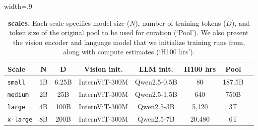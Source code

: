 \begin{table}[!t]
\centering
\caption{\textbf{\dcvlm scales.} Each scale specifies model size ($N$), number of training tokens ($D$), and token size of the original pool to be used for curation (`Pool'). We also present the vision encoder and language model that we initialize training runs from, along with compute estimates (`H100 hrs').}
\label{tab:scales}
\begin{adjustbox}{width=.9\linewidth}
\footnotesize
\begin{tabular}{lccccccc}
\toprule
\textbf{Scale} & $\boldsymbol{N}$ & $\boldsymbol{D}$ & \textbf{Vision init.} & \textbf{LLM init.} & \textbf{H100 hrs} & \textbf{Pool} \\
\midrule
\texttt{small}   & 1B & 6.25B & InternViT-300M & Qwen2.5-0.5B & 80    & 187.5B \\
\texttt{medium}  & 2B & 25B   & InternViT-300M & Qwen2.5-1.5B   & 640  & 750B \\
\texttt{large}   & 4B & 100B  & InternViT-300M & Qwen2.5-3B   & 5,120  & 3T \\
\texttt{x-large} & 8B & 200B  & InternViT-300M & Qwen2.5-7B   & 20,480 & 6T \\
\bottomrule
\end{tabular}
\end{adjustbox}
\end{table}
